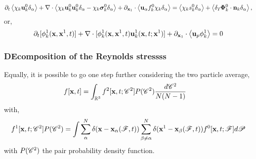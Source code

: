 \begin{equation*}
    \partial_t \left<\chi_k \textbf{u}_k^0 \delta_{\alpha}\right>
    + \mathbf{\nabla}\cdot 
        \left<\chi_k \textbf{u}_k^0 \textbf{u}_k^0 \delta_{\alpha}
        - \chi_k \bm\sigma_k^0  \delta_{\alpha}\right>
    + \partial_{\textbf{x}_1}\cdot \left<\textbf{u}_\alpha f^0_k\chi_k\delta_\alpha\right>
    = 
    \left<\chi_k s_k^0 \delta_{\alpha}\right>
    + \left<\delta_I
         \mathbf{\Phi}_k^0
    \cdot \textbf{n}_k  \delta_{\alpha}\right>,
\end{equation*}
or, 
\begin{equation*}
    \partial_t [\phi_k^1(\textbf{x},\textbf{x}^1,t)]
    + \mathbf{\nabla}\cdot[\phi_k^1(\textbf{x},\textbf{x}^1,t) \textbf{u}_k^1(\textbf{x},t;\textbf{x}^1)]
    + \partial_{\textbf{x}_1}\cdot \left<\textbf{u}_p\phi_k^1\right>
    = 
    0
\end{equation*}



\subsubsection{DEcomposition of the Reynolds stressss}


Equally, it is possible to go one step further considering the two particle average, 
\begin{align*}
    f[\textbf{x},t]
    &= \int_{\mathbb{R}^3}
    f^2[\textbf{x},t;\mathscr{C}^2]
    P(\mathscr{C}^2)
    \frac{d\mathscr{C}^2}{N(N-1)}
\end{align*}
with, 
\begin{equation*}
    f^1[\textbf{x},t;\mathscr{C}^2] P(\mathscr{C}^2)
    = 
    \int 
    \sum_\alpha^N \delta(\textbf{x} - \textbf{x}_\alpha(\mathscr{F},t))
    \sum_{\beta\neq\alpha}^N \delta(\textbf{x}^1 - \textbf{x}_\beta(\mathscr{F},t))
    f^0[\textbf{x},t;\mathscr{F}]
    d\mathscr{P}
\end{equation*}
with $P(\mathscr{C}^2)$ the pair probability density function. 


